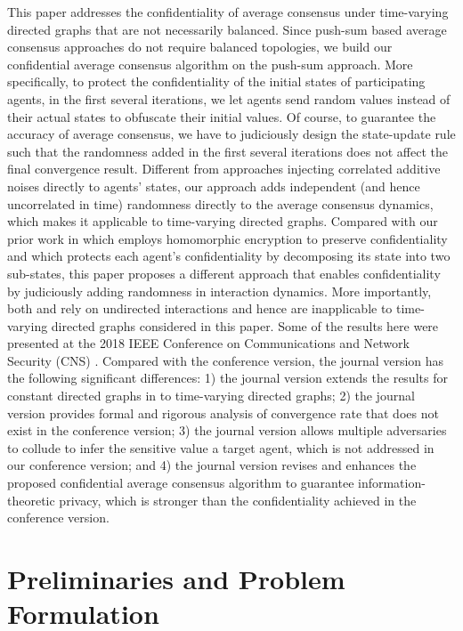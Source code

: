 \documentclass{IEEEtran}
\begin{document}
This paper addresses the confidentiality of average consensus under time-varying directed graphs that are not necessarily balanced. Since push-sum based average consensus approaches do not require balanced topologies, we build our confidential average consensus algorithm on the push-sum approach. More specifically, to protect the confidentiality of the initial states of participating agents, in the first several iterations, we let agents send random values instead of their actual states to obfuscate their initial values. Of course, to guarantee the accuracy of average consensus, we have to judiciously design the state-update rule such that the randomness added in the first several iterations does not affect the final convergence result. Different from approaches injecting correlated additive noises directly to agents' states, our approach adds independent (and hence uncorrelated in time) randomness directly to the average consensus dynamics, which makes it applicable to time-varying directed graphs. Compared with our prior work in \cite{ruan2019secure} which employs homomorphic encryption to preserve confidentiality and \cite{wang2019privacy} which protects each agent's confidentiality by decomposing its state into two sub-states, this paper proposes a different approach that enables confidentiality by judiciously adding randomness in interaction dynamics. More importantly, both \cite{ruan2019secure} and \cite{wang2019privacy} rely on undirected interactions and hence are inapplicable to time-varying directed graphs considered in this paper. Some of the results here were presented at the 2018 IEEE Conference on Communications and Network Security (CNS) \cite{Huan2018CNS}. Compared with the conference version, the journal version has the following significant differences: 1) the journal version extends the results for constant directed graphs in \cite{Huan2018CNS} to time-varying directed graphs; 2) the journal version provides formal and rigorous analysis of convergence rate that does not exist in the conference version; 3) the journal version allows multiple adversaries to collude to infer the sensitive value a target agent, which is not addressed in our conference version; and 4) the journal version revises and enhances the proposed confidential average consensus algorithm to guarantee information-theoretic privacy, which is stronger than the confidentiality achieved in the conference version.

\section{Preliminaries and Problem Formulation}
\end{document}

